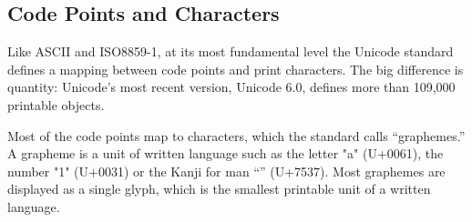 \subsection{Code Points and Characters}

Like ASCII and ISO8859-1, at its most fundamental level the Unicode standard defines a mapping between code points and print characters. The big difference is quantity: Unicode's most recent version, Unicode 6.0, defines more than 109,000 printable objects. 

Most of the code points map to characters, which the standard  calls
``graphemes.'' A grapheme is a unit of written language such as the
letter "a" (U+0061), the number "1" (U+0031) or the Kanji for man
``'' (U+7537). Most graphemes are
displayed as a single glyph, which is the smallest printable unit of a
written language.  

